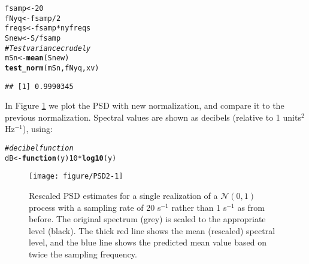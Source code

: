 \documentclass[10pt]{article}\usepackage[]{graphicx}\usepackage[]{color}
\makeatletter
\def\maxwidth{ %
  \ifdim\Gin@nat@width>\linewidth
    \linewidth
  \else
    \Gin@nat@width
  \fi
}
\newcommand{\hlnum}[1]{\textcolor[rgb]{0.686,0.059,0.569}{#1}}%
\newcommand{\hlcom}[1]{\textcolor[rgb]{0.678,0.584,0.686}{\textit{#1}}}%
\newcommand{\hlopt}[1]{\textcolor[rgb]{0,0,0}{#1}}%
\newcommand{\hlstd}[1]{\textcolor[rgb]{0.345,0.345,0.345}{#1}}%
\newcommand{\hlkwa}[1]{\textcolor[rgb]{0.161,0.373,0.58}{\textbf{#1}}}%
\newcommand{\hlkwb}[1]{\textcolor[rgb]{0.69,0.353,0.396}{#1}}%
\newcommand{\hlkwc}[1]{\textcolor[rgb]{0.333,0.667,0.333}{#1}}%
\newcommand{\hlkwd}[1]{\textcolor[rgb]{0.737,0.353,0.396}{\textbf{#1}}}%
\newenvironment{kframe}{%
 \def\at@end@of@kframe{}%
 \ifinner\ifhmode%
  \def\at@end@of@kframe{\end{minipage}}%
  \begin{minipage}{\columnwidth}%
 \fi\fi%
 \def\FrameCommand##1{\hskip\@totalleftmargin \hskip-\fboxsep
 \colorbox{shadecolor}{##1}\hskip-\fboxsep
     \hskip-\linewidth \hskip-\@totalleftmargin \hskip\columnwidth}%
 \MakeFramed {\advance\hsize-\width
   \@totalleftmargin\z@ \linewidth\hsize
   \@setminipage}}%
 {\par\unskip\endMakeFramed%
 \at@end@of@kframe}
\newenvironment{knitrout}{}{} %
\makeatother
\begin{document}
\begin{knitrout}
\color{fgcolor}\begin{kframe}
\begin{alltt}
\hlstd{fsamp} \hlkwb{<-} \hlnum{20}
\hlstd{fNyq} \hlkwb{<-} \hlstd{fsamp} \hlopt{/} \hlnum{2}
\hlstd{freqs} \hlkwb{<-} \hlstd{fsamp} \hlopt{*} \hlstd{nyfreqs}
\hlstd{Snew} \hlkwb{<-} \hlstd{S} \hlopt{/} \hlstd{fsamp}
\hlcom{# Test variance crudely}
\hlstd{mSn} \hlkwb{<-} \hlkwd{mean}\hlstd{(Snew)}
\hlkwd{test_norm}\hlstd{(mSn, fNyq, xv)}
\end{alltt}
\begin{verbatim}
## [1] 0.9990345
\end{verbatim}
\end{kframe}
\end{knitrout}

In Figure \ref{fig:psdsamp} we
plot the PSD with new normalization, and compare it to
the previous normalization.
Spectral values are shown as
decibels (relative to 1 units$^2$ Hz$^{-1}$), using:

\begin{knitrout}
\color{fgcolor}\begin{kframe}
\begin{alltt}
\hlcom{# decibel function}
\hlstd{dB} \hlkwb{<-} \hlkwa{function}\hlstd{(}\hlkwc{y}\hlstd{)} \hlnum{10}\hlopt{*}\hlkwd{log10}\hlstd{(y)}
\end{alltt}
\end{kframe}
\end{knitrout}
\begin{figure}[htb!]
\begin{center}
\begin{knitrout}
\color{fgcolor}
\texttt{[image: figure/PSD2-1]} 

\end{knitrout}
\caption{Rescaled PSD estimates for a single realization of a 
$\mathcal{N}(0,1)$ process with a sampling rate of 20 s$^{-1}$ rather
than 1 s$^{-1}$ as from before.  
The original spectrum (grey) is scaled to the appropriate level
(black).
The thick red line shows the mean (rescaled) spectral level, and the
blue line shows the predicted mean value based on twice the sampling
frequency.}
\label{fig:psdsamp}
\end{center}
\end{figure}
\end{document}
